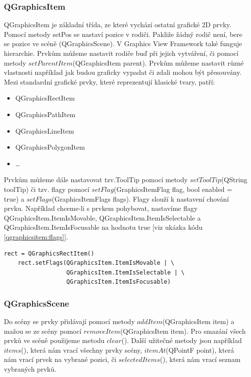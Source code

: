 \subsubsection*{QGraphicsItem}
QGraphicsItem je základní třída, ze které vychází ostatní grafické 2D prvky. Pomocí metody setPos se nastaví pozice v rodiči. Pakliže žádný rodič není, bere se pozice ve scéně (QGraphicsScene). V Graphics View Framework také funguje hierarchie. Prvkům můžeme nastavit rodiče buď při jejich vytváření, či pomocí metody $setParentItem$(QGraphicsItem parent). Prvkům můžeme nastavit různé vlastnosti například jak budou graficky vypadat či zdali mohou být přesouvány. Mezi standardní grafické prvky, které reprezentují klasické tvary, patří:\\

\begin{itemize}
	\item QGraphicsRectItem
	\item QGraphicsPathItem
	\item QGraphicsLineItem
	\item QGraphicsPolygonItem
	\item \ldots
\end{itemize}
 
Prvkům můžeme dále nastavovat tzv.ToolTip pomocí metody $setToolTip$(QString toolTip) či tzv. flagy pomocí $setFlag$(GraphicsItemFlag flag, bool enabled = true) a $setFlags$(GraphicsItemFlags flags). Flagy slouží k nastavení chování prvku. Například chceme-li s prvkem pohybovat, nastavíme flagy QGraphicsItem.ItemIsMovable, QGraphicsItem.ItemIsSelectable a QGraphicsItem.ItemIsFocusable na hodnotu true [viz ukázka kódu \ref{qgraphicsitem:flags}].\\
 
\begin{lstlisting}[label=qgraphicsitem:flags,caption={Nastavení flagů u QGraphicsRectItem}, morekeywords={QGraphicsItem, QGraphicsRectItem}] 
	rect = QGraphicsRectItem()
	rect.setFlags(QGraphicsItem.ItemIsMovable | \
				  QGraphicsItem.ItemIsSelectable | \
				  QGraphicsItem.ItemIsFocusable)
\end{lstlisting}
 
\subsubsection*{QGraphicsScene}
Do scény se prvky přidávají pomocí metody $addItem$(QGraphicsItem item) a mažou se ze scény pomocí $removeItem$(QGraphicsItem item). Pro smazání všech prvků ve scéně použijeme metodu $clear$(). Další užitečné metody jsou například $items$(), která nám vrací všechny prvky scény, $itemAt$(QPointF point), která nám vrací prvek na vybrané pozici, či $selectedItems$(), která nám vrací seznam vybraných prvků.

